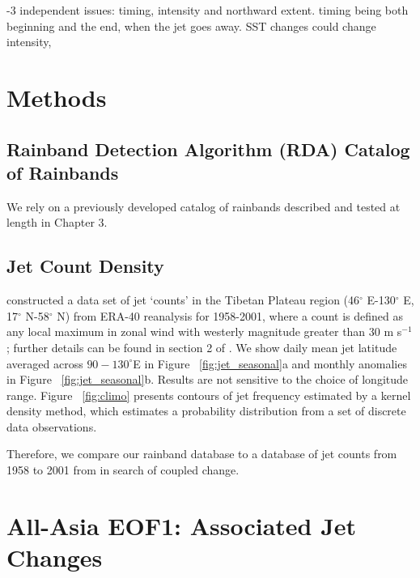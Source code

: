 	-3 independent issues: timing, intensity and northward extent. timing being both beginning and the end, when the jet goes away. SST changes could change intensity, 
	
\section{Methods}

\subsection{Rainband Detection Algorithm (RDA) Catalog of Rainbands}

	We rely on a previously developed catalog of rainbands described and tested at length in Chapter 3.

\subsection{Jet Count Density} 

	\citet{Schiemann2009} constructed a data set of jet `counts' in the Tibetan Plateau region (46$^{\circ}$ E-130$^{\circ}$ E, 17$^{\circ}$ N-58$^{\circ}$ N) from ERA-40 reanalysis for 1958-2001, where a count is defined as any local maximum in zonal wind with westerly magnitude greater than $30$ m s$^{-1}$; further details can be found in section 2 of \citet{Schiemann2009}. We show daily mean jet latitude averaged across $90-130^\circ$E in Figure ~\ref{fig:jet_seasonal}a and monthly anomalies in Figure ~\ref{fig:jet_seasonal}b. Results are not sensitive to the choice of longitude range. Figure ~\ref{fig:climo} presents contours of jet frequency estimated by a kernel density method, which estimates a probability distribution from a set of discrete data observations.
	
	Therefore, we compare our rainband database to a database of jet counts from 1958 to 2001 from \citet{Schiemann2009} in search of coupled change. 
	
\section{All-Asia EOF1: Associated Jet Changes}

